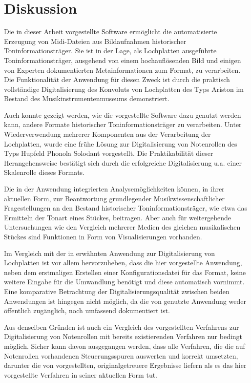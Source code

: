\section{Diskussion}

Die in dieser Arbeit vorgestellte Software ermöglicht die automatisierte Erzeugung von Midi-Dateien aus Bildaufnahmen historischer Toninformationsträger.
Sie ist in der Lage, als Lochplatten ausgeführte Toninformationsträger, ausgehend von einem hochauflösenden Bild und einigen von Experten dokumentierten Metainformationen zum Format, zu verarbeiten.
Die Funktionalität der Anwendung für diesen Zweck ist durch die praktisch vollständige Digitalisierung des Konvoluts von Lochplatten des Typs Ariston im Bestand des Musikinstrumentenmuseums demonstriert.

Auch konnte gezeigt werden, wie die vorgestellte Software dazu genutzt werden kann, andere Formate historischer Toninformationsträger zu verarbeiten.
Unter Wiederverwendung mehrerer Komponenten aus der Verarbeitung der Lochplatten, wurde eine frühe Lösung zur Digitalisierung von Notenrollen des Typs Hupfeld Phonola Solodant vorgestellt.
Die Praktikabilität dieser Herangehensweise bestätigt sich durch die erfolgreiche Digitalisierung u.a. einer Skalenrolle dieses Formats. 

Die in der Anwendung integrierten Analysemöglichkeiten können, in ihrer aktuellen Form, zur Beantwortung grundlegender Musikwissenschaftlicher Fragestellungen an den Bestand historischer Toninformationsträger, wie etwa das Ermitteln der Tonart eines Stückes, beitragen.
Aber auch für weitergehende Untersuchungen wie den Vergleich mehrerer Medien des gleichen musikalischen Stückes sind Funktionen in Form von Visualisierungen vorhanden.

Im Vergleich mit der in \textcite[]{perretti_2014} erwähnten Anwendung zur Digitalisierung von Lochplatten ist vor allem hervorzuheben, dass die hier vorgestellte Anwendung, neben dem erstmaligen Erstellen einer Konfigurationsdatei für das Format, keine weitere Eingabe für die Umwandlung benötigt und diese automatisch vornimmt.
Eine komparative Betrachtung der Digitalisierungsqualität zwischen beiden Anwendungen ist hingegen nicht möglich, da die von \textcite[]{perretti_2014} genutzte Anwendung weder öffentlich zugänglich, noch umfassend dokumentiert ist.

Aus denselben Gründen ist auch ein Vergleich des vorgestellten Verfahrens zur Digitalisierung von Notenrollen mit bereits existierenden Verfahren nur bedingt möglich.
Sicher kann davon ausgegangen werden, dass alle Verfahren, die die auf Notenrollen vorhandenen Steuerungsspuren auswerten und korrekt umsetzten, darunter die von \textcite[]{shi_2019, zoltan_1994, colmenares_2011} vorgestellten, originalgetreuere Ergebnisse liefern als es das hier vorgestellte Verfahren in seiner aktuellen Form tut.

